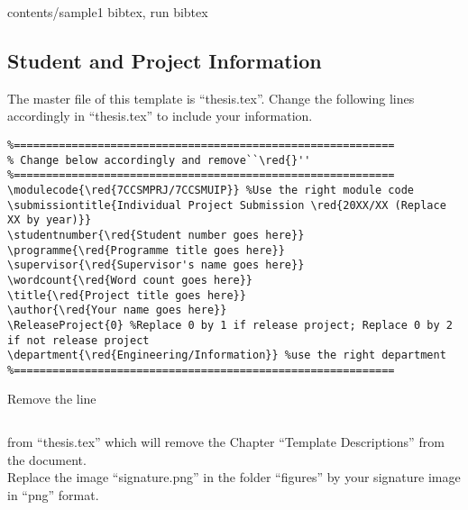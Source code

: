 contents/sample1
bibtex, run bibtex

\subsection{Student and Project Information}
	The master file of this template is ``thesis.tex''. Change the following lines accordingly in ``thesis.tex'' to include your information.

\begin{verbatim}
%===========================================================
% Change below accordingly and remove``\red{}''
%===========================================================
\modulecode{\red{7CCSMPRJ/7CCSMUIP}} %Use the right module code
\submissiontitle{Individual Project Submission \red{20XX/XX (Replace XX by year)}}
\studentnumber{\red{Student number goes here}}
\programme{\red{Programme title goes here}}
\supervisor{\red{Supervisor's name goes here}}
\wordcount{\red{Word count goes here}}
\title{\red{Project title goes here}}
\author{\red{Your name goes here}}
\ReleaseProject{0} %Replace 0 by 1 if release project; Replace 0 by 2 if not release project
\department{\red{Engineering/Information}} %use the right department
%===========================================================
\end{verbatim}

	Remove the line \begin{verbatim} \end{verbatim} from ``thesis.tex'' which will remove the Chapter ``Template Descriptions'' from the document.\\
	
	Replace the image ``signature.png'' in the folder ``figures'' by your signature image in ``png'' format.